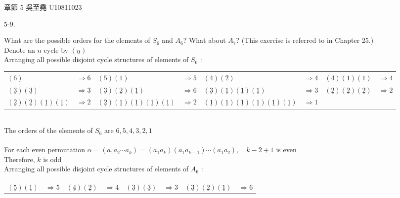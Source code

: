 \documentclass[12pt]{book}
\author{andersonwu2000}
\begin{document}
\begin{CJK}{UTF8}{bsmi}

\hfill 章節 5 吳至堯 U10811023


5-9. \begin{minipage}[t]{\dimexpr\linewidth-2em}
What are the possible orders for the elements of $S_6$ and $A_6$? What about $A_7$? (This exercise is referred to in Chapter 25.) \\
Denote an $n$-cycle by $(\underline{n})$ \\
Arranging all possible disjoint cycle structures of elements of $S_6$ : \\
\begin{tabular}{lc|lc|lc|lc}
    $(\underline{6})$ & $\Rightarrow 6$ &
    $(\underline{5})(\underline{1})$ & $\Rightarrow 5$ &
    $(\underline{4})(\underline{2})$ & $\Rightarrow 4$ &
    $(\underline{4})(\underline{1})(\underline{1})$ & $\Rightarrow 4$ \\
    $(\underline{3})(\underline{3})$ & $\Rightarrow 3$ &
    $(\underline{3})(\underline{2})(\underline{1})$ & $\Rightarrow 6$ &
    $(\underline{3})(\underline{1})(\underline{1})(\underline{1})$ & $\Rightarrow 3$ &
    $(\underline{2})(\underline{2})(\underline{2})$ & $\Rightarrow 2$ \\
    $(\underline{2})(\underline{2})(\underline{1})(\underline{1})$ & $\Rightarrow 2$ &
    $(\underline{2})(\underline{1})(\underline{1})(\underline{1})(\underline{1})$ & $\Rightarrow 2$ &
    $(\underline{1})(\underline{1})(\underline{1})(\underline{1})(\underline{1})(\underline{1})$ & $\Rightarrow 1$ 
    \end{tabular} \\
The orders of the elements of $S_6$ are $6, 5, 4, 3, 2, 1$ \\\\
For each even permutation $\alpha=(a_1 a_2 \cdots a_k)=(a_1a_k)(a_1a_{k-1})\cdots(a_1a_2),\quad k-2+1$ is even \\
Therefore, $k$ is odd \\
Arranging all possible disjoint cycle structures of elements of $A_6$ : \\
\begin{tabular}{lc|lc|lc|lc}
    $(\underline{5})(\underline{1})$ & $\Rightarrow 5$ &
    $(\underline{4})(\underline{2})$ & $\Rightarrow 4$ &
    $(\underline{3})(\underline{3})$ & $\Rightarrow 3$ &
    $(\underline{3})(\underline{2})(\underline{1})$ & $\Rightarrow 6$ \\

\end{tabular}
\end{minipage}
\end{CJK}
\end{document}

